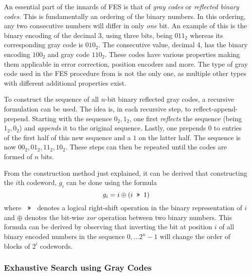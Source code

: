 An essential part of the innards of FES is that of \textit{gray codes} or \textit{reflected binary codes}. This is fundamentally an ordering of the binary numbers. In this ordering, any two consecutive numbers will differ in only \textit{one} bit. An example of this is the binary encoding of the decimal 3, using three bits, being $011_2$ whereas its corresponding gray code is $010_2$.
The consecutive value, decimal 4, has the binary encoding $100_2$ and gray code $110_2$. These codes have various properties making them applicable in error correction, position encoders and more. The type of gray code used in the FES procedure from \cite{ches-2010-23990, cryptoeprint:2013/436} is not the only one, as multiple other types with different additional properties exist.

To construct the sequence of all $n$-bit binary reflected gray codes, a recursive formulation can be used. The idea is, in each recursive step, to reflect-append-prepend. Starting with the sequence $0_2, 1_2$, one first \textit{reflects} the sequence (being $1_2, 0_2$) and \textit{appends} it to the original sequence. Lastly, one prepends $0$ to entries of the first half of this new sequence and a $1$ on the latter half. The sequence is now $00_2, 01_2, 11_2, 10_2$. These steps can then be repeated until the codes are formed of $n$ bits.

From the construction method just explained, it can be derived that constructing the $i$th codeword, $g_i$ can be done using the formula
$$
    g_i = i \oplus (i \texttt{ >> } 1)
$$
where $\texttt{ >> }$ denotes a logical right-shift operation in the binary representation of $i$ and $\oplus$ denotes the bit-wise \textit{xor} operation between two binary numbers. This formula can be derived by observing that inverting the bit at position $i$ of all binary encoded numbers in the sequence $0,\dots 2^{n} - 1$ will change the order of blocks of $2^i$ codewords.

\subsubsection{Exhaustive Search using Gray Codes} \label{sec:prereq:fes:exh_g_code}

